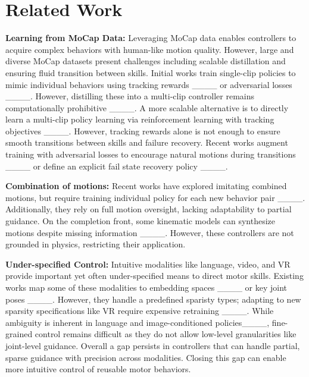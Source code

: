 \section{Related Work}
\label{sec:related}
\textbf{Learning from MoCap Data:} Leveraging MoCap data enables controllers to acquire complex behaviors with human-like motion quality. However, large and diverse MoCap datasets present challenges including scalable distillation and ensuring fluid transition between skills. Initial works train single-clip policies to mimic individual behaviors using tracking rewards ____ or adversarial losses ____. However, distilling these into a multi-clip controller remains computationally prohibitive ____. A more scalable alternative is to directly learn a multi-clip policy learning via reinforcement learning with tracking objectives ____. However, tracking rewards alone is not enough to ensure smooth transitions between skills and failure recovery. Recent works augment training with adversarial losses to encourage natural motions during transitions ____ or define an explicit fail state recovery policy ____. 

\textbf{Combination of motions:} Recent works have explored imitating combined motions, but require training individual policy for each new behavior pair ____. Additionally, they rely on full motion oversight, lacking adaptability to partial guidance. On the completion front, some kinematic models can synthesize motions despite missing information ____. However, these controllers are not grounded in physics, restricting their application.

\textbf{Under-specified Control:} Intuitive modalities like language, video, and VR provide important yet often under-specified means to direct motor skills. Existing works map some of these modalities to embedding spaces ____ or key joint poses ____. However, they handle a predefined sparisty types; adapting to new sparsity specifications like VR require expensive retraining ____. While ambiguity is inherent in language and image-conditioned policies____, fine-grained control remains difficult as they do not allow low-level granularities like joint-level guidance. Overall a gap persists in controllers that can handle partial, sparse guidance with precision across modalities. Closing this gap can enable more intuitive control of reusable motor behaviors.


